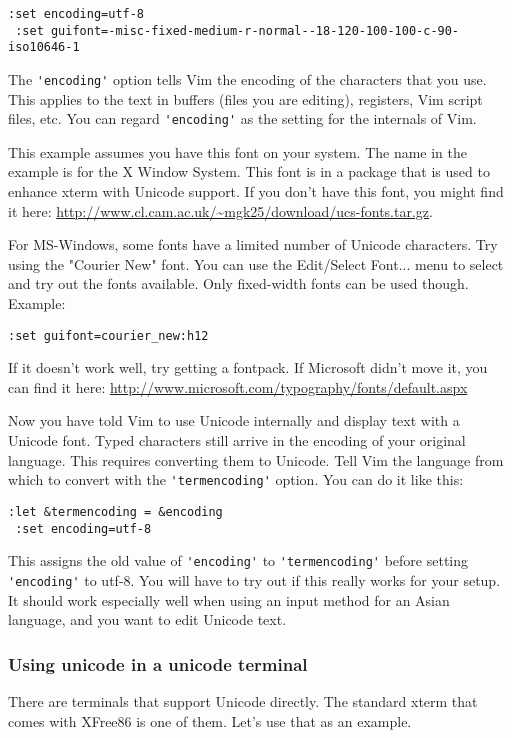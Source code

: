 \begin{Verbatim}[samepage=true]
 :set encoding=utf-8
 :set guifont=-misc-fixed-medium-r-normal--18-120-100-100-c-90-iso10646-1
\end{Verbatim}

The \verb!'encoding'! option tells Vim the encoding of the characters that you use.
This applies to the text in buffers (files you are editing), registers, Vim script files, etc.
You can regard \verb!'encoding'! as the setting for the internals of Vim.

This example assumes you have this font on your system.
The name in the example is for the X Window System.
This font is in a package that is used to enhance xterm with Unicode support.
If you don't have this font, you might find it here: \url{http://www.cl.cam.ac.uk/~mgk25/download/ucs-fonts.tar.gz}.

For MS-Windows, some fonts have a limited number of Unicode characters.
Try using the "Courier New" font.
You can use the Edit/Select Font... menu to select and try out the fonts available.
Only fixed-width fonts can be used though.
Example:

\begin{Verbatim}[samepage=true]
 :set guifont=courier_new:h12
\end{Verbatim}

If it doesn't work well, try getting a fontpack.
If Microsoft didn't move it, you can find it here: \url{http://www.microsoft.com/typography/fonts/default.aspx}

Now you have told Vim to use Unicode internally and display text with a Unicode font.
Typed characters still arrive in the encoding of your original language.
This requires converting them to Unicode.
Tell Vim the language from which to convert with the \verb!'termencoding'! option.
You can do it like this:

\begin{Verbatim}[samepage=true]
 :let &termencoding = &encoding
 :set encoding=utf-8
\end{Verbatim}

This assigns the old value of \verb!'encoding'! to \verb!'termencoding'! before setting \verb!'encoding'! to utf-8.
You will have to try out if this really works for your setup.
It should work especially well when using an input method for an Asian language, and you want to edit Unicode text.

\subsubsection{Using unicode in a unicode terminal}
There are terminals that support Unicode directly.
The standard xterm that comes with XFree86 is one of them.
Let's use that as an example.

